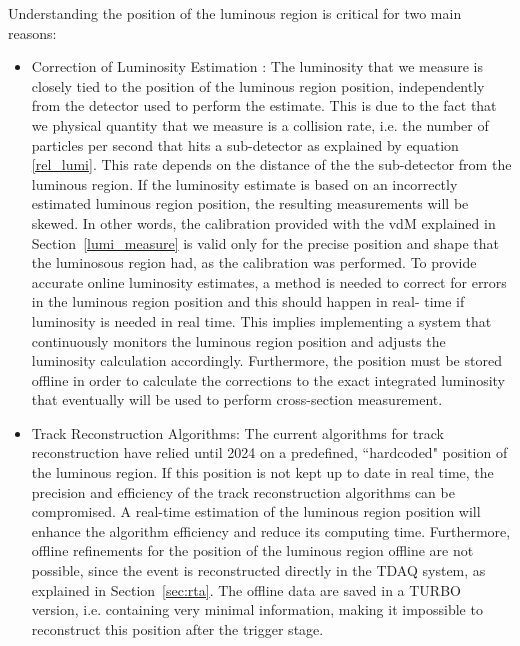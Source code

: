 Understanding the position of the luminous region is critical for two main reasons:
\begin{itemize}
\item Correction of Luminosity Estimation : The luminosity that we measure is closely tied to the position of the luminous region position, independently from the detector used to perform the estimate. This is due to the fact that we physical quantity that we measure is a collision rate, i.e. the number of particles per second that hits a sub-detector as explained by equation \eqref{rel_lumi}. This rate depends on the distance of the the sub-detector from the luminous region. If the luminosity estimate is based on an incorrectly estimated luminous region position, the resulting measurements will be skewed. In other words, the calibration provided with the vdM explained in Section~\ref{lumi_measure} is valid only for the precise position and shape that the luminosous region had, as the calibration was performed. To provide accurate online luminosity estimates, a method is needed to correct for errors in the luminous region position and this should happen in real- time if luminosity is needed in real time. This implies implementing a system that continuously monitors the luminous region position and adjusts the luminosity calculation accordingly. Furthermore, the position must be stored offline in order to calculate the corrections to the exact integrated luminosity that eventually will be used to perform cross-section measurement.
\item Track Reconstruction Algorithms: The current algorithms for track reconstruction have relied until 2024 on a predefined, ``hardcoded" position of the luminous region. If this position is not kept up to date in real time, the precision and efficiency of the track reconstruction algorithms can be compromised. A real-time estimation of the luminous region position will enhance the algorithm efficiency and reduce its computing time. Furthermore, offline refinements for the position of the luminous region offline are not possible, since the event is reconstructed directly in the TDAQ system, as explained in Section~\ref{sec:rta}. The offline data are saved in a TURBO version, i.e. containing very minimal information, making it impossible to reconstruct this position after the trigger stage.
\end{itemize}

